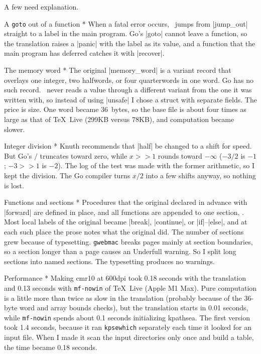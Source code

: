 {\noindent A few need explanation.

\subhead * A {\tt goto} out of a function *
When a fatal error occurs, \MF\ jumps from |jump_out| straight to a
label in the main program. Go's |goto| cannot leave a function, so the
translation raises a |panic| with the label as its value, and a
function that the main program has deferred catches it with |recover|.

\subhead * The memory word *
The original |memory_word| is a variant record that overlays one
integer, two halfwords, or four quarterwords in one word. Go has no
such record. \MF\ never reads a value through a different variant from
the one it was written with, so instead of using |unsafe| I chose a
struct with separate fields. The price is size. One word became
36~bytes, so the base file is about four times as large as that of
\TeX\ Live (299\thinspace KB versus 78\thinspace KB), and computation
became slower.

\subhead * Integer division *
Knuth recommends that |half| be changed to a shift for speed. But Go's
$/$ truncates toward zero, while $x>\!\!>1$ rounds toward $-\infty$
($-3/2$ is $-1$; $-3>\!\!>1$ is $-2$). The log of the  test was
made with the former arithmetic, so I kept the division. The Go
compiler turns $x/2$ into a few shifts anyway, so nothing is lost.

\subhead * Functions and sections *
Procedures that the original declared in advance with |forward| are
defined in place, and all functions are appended to one section,
. Most local labels of the original became |break|,
|continue|, or |if|--|else|, and at each such place the prose notes
what the original did. The number of sections grew because of
typesetting. {\tt gwebmac} breaks pages mainly at section boundaries,
so a section longer than a page causes an Underfull warning. So I split
long sections into named sections. The typesetting produces no
warnings.

\subhead * Performance *
Making cmr10 at 600\thinspace dpi took 0.18 seconds with the
translation and 0.13 seconds with {\tt mf-nowin} of \TeX\ Live (Apple
M1 Max). Pure computation is a little more than twice as slow in the
translation (probably because of the 36-byte word and array bounds
checks), but the translation starts in 0.01 seconds, while
{\tt mf-nowin} spends about 0.1 seconds initializing kpathsea. The
first version took 1.4 seconds, because it ran {\tt kpsewhich}
separately each time it looked for an input file. When I made it scan
the input directories only once and build a table, the time became
0.18 seconds.

}
